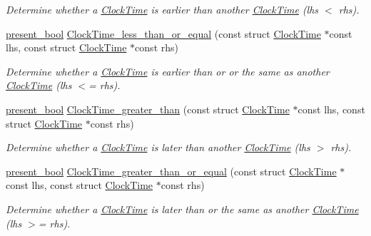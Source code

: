 \begin{DoxyCompactItemize}
\begin{DoxyCompactList}\small\item\em \-Determine whether a \hyperlink{structClockTime}{\-Clock\-Time} is earlier than another \hyperlink{structClockTime}{\-Clock\-Time} (lhs $<$ rhs). \end{DoxyCompactList}\item 
\hyperlink{types_8h_a1c24e2cdd988b886e889080ded176ae0}{present\-\_\-bool} \hyperlink{clock-time_8h_a8725113f40fe7aae309480cc0b666c16}{\-Clock\-Time\-\_\-less\-\_\-than\-\_\-or\-\_\-equal} (const struct \hyperlink{structClockTime}{\-Clock\-Time} $\ast$const lhs, const struct \hyperlink{structClockTime}{\-Clock\-Time} $\ast$const rhs)
\begin{DoxyCompactList}\small\item\em \-Determine whether a \hyperlink{structClockTime}{\-Clock\-Time} is earlier than or or the same as another \hyperlink{structClockTime}{\-Clock\-Time} (lhs $<$= rhs). \end{DoxyCompactList}\item 
\hyperlink{types_8h_a1c24e2cdd988b886e889080ded176ae0}{present\-\_\-bool} \hyperlink{clock-time_8h_ae2c5d81af2ab38abf4248271cb45be33}{\-Clock\-Time\-\_\-greater\-\_\-than} (const struct \hyperlink{structClockTime}{\-Clock\-Time} $\ast$const lhs, const struct \hyperlink{structClockTime}{\-Clock\-Time} $\ast$const rhs)
\begin{DoxyCompactList}\small\item\em \-Determine whether a \hyperlink{structClockTime}{\-Clock\-Time} is later than another \hyperlink{structClockTime}{\-Clock\-Time} (lhs $>$ rhs). \end{DoxyCompactList}\item 
\hyperlink{types_8h_a1c24e2cdd988b886e889080ded176ae0}{present\-\_\-bool} \hyperlink{clock-time_8h_af8b0d5b33438ceddeae53b1d79f132b8}{\-Clock\-Time\-\_\-greater\-\_\-than\-\_\-or\-\_\-equal} (const struct \hyperlink{structClockTime}{\-Clock\-Time} $\ast$const lhs, const struct \hyperlink{structClockTime}{\-Clock\-Time} $\ast$const rhs)
\begin{DoxyCompactList}\small\item\em \-Determine whether a \hyperlink{structClockTime}{\-Clock\-Time} is later than or the same as another \hyperlink{structClockTime}{\-Clock\-Time} (lhs $>$= rhs). \end{DoxyCompactList}\end{DoxyCompactItemize}


